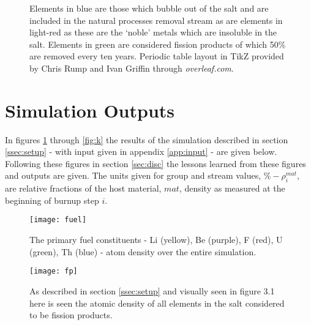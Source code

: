 \begin{figure}
\begin{centering}
\end{centering}
\caption{Elements in blue are those which bubble out of the salt and are
included in the natural processes removal stream as are elements in light-red
as these are the `noble' metals which are insoluble in the salt. Elements in
green are considered fission products of which 50\% are removed every ten
years. Periodic table layout in TikZ provided by Chris Rump and Ivan Griffin
through \textit{overleaf.com}.}
\end{figure}

\section{Simulation Outputs}\label{ssec:outputs}

In figures \ref{fig:fuel} through \ref{fig:k} the results of the simulation
described in section \ref{ssec:setup} - with input given in appendix 
\ref{app:input} - are given below. Following these figures in section
\ref{sec:disc} the lessons learned from these figures and outputs are
given. The units given for group and stream values, $\%-\rho^{mat}_{i}$, are
relative fractions of the host material, $mat$, density as measured at the 
beginning of burnup step $i$.

\begin{figure}[H]
    \centering
    \texttt{[image: fuel]}
    \caption{The primary fuel constituents - Li (yellow), Be (purple), F (red),
    U (green), Th (blue) - atom density over the entire simulation.}
    \label{fig:fuel}
\end{figure}

\begin{figure}[H]
    \centering
    \texttt{[image: fp]}
    \caption{As described in section \ref{ssec:setup} and visually seen in
    figure 3.1 here is seen the atomic density of all elements
    in the salt considered to be fission products.}
    \label{fig:fp}
\end{figure}

